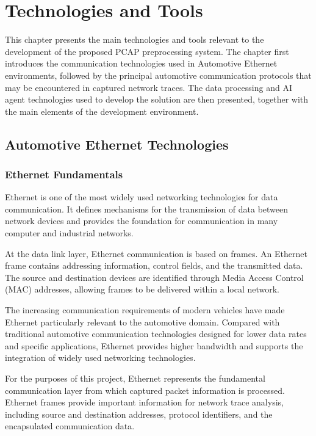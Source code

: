 \chapter{Technologies and Tools}

This chapter presents the main technologies and tools relevant to the development of the proposed PCAP preprocessing system. The chapter first introduces the communication technologies used in Automotive Ethernet environments, followed by the principal automotive communication protocols that may be encountered in captured network traces. The data processing and AI agent technologies used to develop the solution are then presented, together with the main elements of the development environment.

\section{Automotive Ethernet Technologies}

\subsection{Ethernet Fundamentals}

Ethernet is one of the most widely used networking technologies for data communication. It defines mechanisms for the transmission of data between network devices and provides the foundation for communication in many computer and industrial networks.

At the data link layer, Ethernet communication is based on frames. An Ethernet frame contains addressing information, control fields, and the transmitted data. The source and destination devices are identified through Media Access Control (MAC) addresses, allowing frames to be delivered within a local network.

The increasing communication requirements of modern vehicles have made Ethernet particularly relevant to the automotive domain. Compared with traditional automotive communication technologies designed for lower data rates and specific applications, Ethernet provides higher bandwidth and supports the integration of widely used networking technologies.

For the purposes of this project, Ethernet represents the fundamental communication layer from which captured packet information is processed. Ethernet frames provide important information for network trace analysis, including source and destination addresses, protocol identifiers, and the encapsulated communication data.

